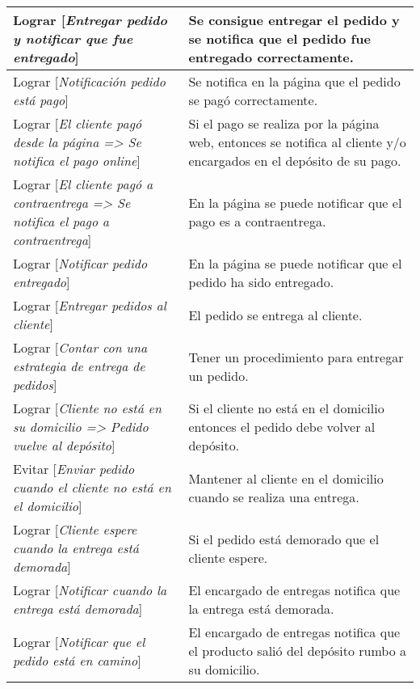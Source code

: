 \begin{center}
\begin{longtable}{p{7cm} p{7cm}}
Lograr [\textit{Entregar pedido y notificar que fue entregado}] & Se consigue entregar el pedido y se notifica que el pedido fue entregado correctamente. \\[0.2em] \hline

Lograr [\textit{Notificación pedido está pago}] & Se notifica en la página que el pedido se pagó correctamente. \\[0.2em] \hline

Lograr [\textit{El cliente pagó desde la página => Se notifica el pago online}] & Si el pago se realiza por la página web, entonces se notifica al cliente y/o encargados en el depósito de su pago. \\[0.2em] \hline

Lograr [\textit{El cliente pagó a contraentrega => Se notifica el pago a contraentrega}] & En la página se puede notificar que el pago es a contraentrega. \\[0.2em] \hline

Lograr [\textit{Notificar pedido entregado}] & En la página se puede notificar que el pedido ha sido entregado. \\[0.2em] \hline

Lograr [\textit{Entregar pedidos al cliente}] & El pedido se entrega al cliente. \\[0.2em] \hline

Lograr [\textit{Contar con una estrategia de entrega de pedidos}] & Tener un procedimiento para entregar un pedido. \\[0.2em] \hline

Lograr [\textit{Cliente no está en su domicilio => Pedido vuelve al depósito}] & Si el cliente no está en el domicilio entonces el pedido debe volver al depósito. \\[0.2em] \hline

Evitar [\textit{Enviar pedido cuando el cliente no está en el domicilio}] & Mantener al cliente en el domicilio cuando se realiza una entrega. \\[0.2em] \hline

Lograr [\textit{Cliente espere cuando la entrega está demorada}] & Si el pedido está demorado que el cliente espere. \\[0.2em] \hline

Lograr [\textit{Notificar cuando la entrega está demorada}] & El encargado de entregas notifica que la entrega está demorada. \\[0.2em] \hline

Lograr [\textit{Notificar que el pedido está en camino}] & El encargado de entregas notifica que el producto salió del depósito rumbo a su domicilio. \\[0.2em] \hline


\end{longtable}
\end{center}
